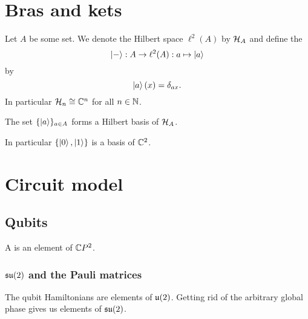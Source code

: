 \chapter{Bras and kets}
\begin{definition}
Let $A$ be some set. We denote the Hilbert space $\ell^2(A)$ by $\mathcal{H}_A$ and define the 
\[ \left| - \right\rangle: A\to \ell^2(A): a\mapsto \left| a \right\rangle \]
by
\[ \left| a \right\rangle(x) = \delta_{ax}. \]
In particular $\mathcal{H}_n \cong \mathbb{C}^n$ for all $n\in\mathbb{N}$.
\end{definition}
The set $\{\left| a \right\rangle\}_{a\in A}$ forms a Hilbert basis of $\mathcal{H}_A$.

In particular $\{\left| 0 \right\rangle, \left| 1 \right\rangle\}$ is a basis of $\mathbb{C}^2$.
\chapter{Circuit model}
\section{Qubits}
\begin{definition}
A  is an element of $\mathbb{C} P^2$.
\end{definition}

\subsection{$\operatorname{\mathfrak{su}}(2)$ and the Pauli matrices}
The qubit Hamiltonians are elements of $\operatorname{\mathfrak{u}}(2)$. Getting rid of the arbitrary global phase gives us elements of $\operatorname{\mathfrak{su}}(2)$.

